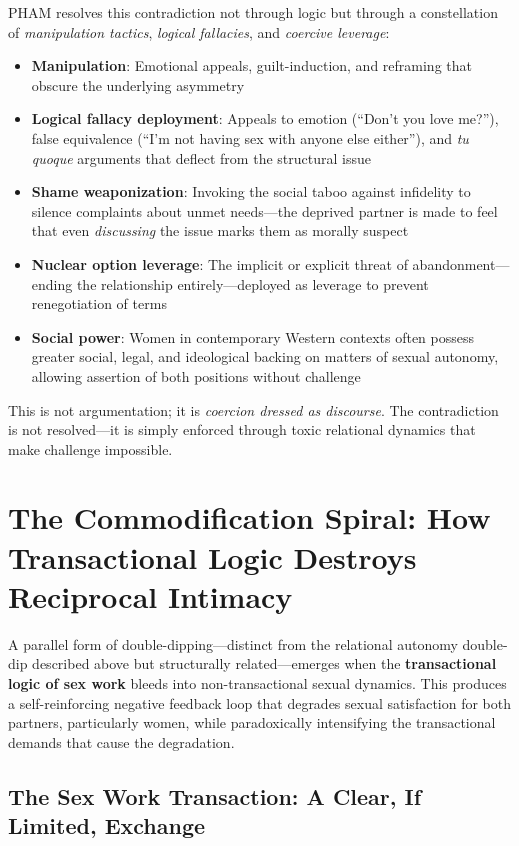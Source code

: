 \documentclass[12pt,openany]{book}
\numberwithin{equation}{chapter}
\begin{document}
PHAM resolves this contradiction not through logic but through a constellation of \textit{manipulation tactics}, \textit{logical fallacies}, and \textit{coercive leverage}:

\begin{itemize}
    \item \textbf{Manipulation}: Emotional appeals, guilt-induction, and reframing that obscure the underlying asymmetry
    \item \textbf{Logical fallacy deployment}: Appeals to emotion (``Don't you love me?''), false equivalence (``I'm not having sex with anyone else either''), and \textit{tu quoque} arguments that deflect from the structural issue
    \item \textbf{Shame weaponization}: Invoking the social taboo against infidelity to silence complaints about unmet needs---the deprived partner is made to feel that even \textit{discussing} the issue marks them as morally suspect
    \item \textbf{Nuclear option leverage}: The implicit or explicit threat of abandonment---ending the relationship entirely---deployed as leverage to prevent renegotiation of terms
    \item \textbf{Social power}: Women in contemporary Western contexts often possess greater social, legal, and ideological backing on matters of sexual autonomy, allowing assertion of both positions without challenge
\end{itemize}

This is not argumentation; it is \textit{coercion dressed as discourse}. The contradiction is not resolved---it is simply enforced through toxic relational dynamics that make challenge impossible.

\section{The Commodification Spiral: How Transactional Logic Destroys Reciprocal Intimacy}

A parallel form of double-dipping---distinct from the relational autonomy double-dip described above but structurally related---emerges when the \textbf{transactional logic of sex work} bleeds into non-transactional sexual dynamics. This produces a self-reinforcing negative feedback loop that degrades sexual satisfaction for both partners, particularly women, while paradoxically intensifying the transactional demands that cause the degradation.

\subsection{The Sex Work Transaction: A Clear, If Limited, Exchange}
\end{document}

